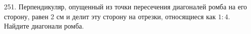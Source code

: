 251. Перпендикуляр, опущенный из точки пересечения
диагоналей ромба на его сторону, равен 2 см и делит эту
сторону на отрезки, относящиеся как $1:4.$ Найдите
диагонали ромба.\\
